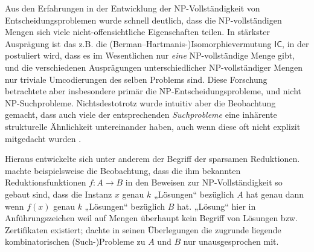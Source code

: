 

Aus den Erfahrungen in der Entwicklung der NP-Vollständigkeit von Entscheidungsproblemen wurde schnell deutlich, dass die NP-vollständigen Mengen sich viele nicht-offensichtliche Eigenschaften teilen. 
In stärkster Ausprägung ist das z.B. die (Berman–Hartmanis-\nolinebreak)\linebreak[1]Isomorphievermutung $\mathsf{IC}$, in der postuliert wird, dass es im Wesentlichen nur \emph{eine} NP-vollständige Menge gibt, und die verschiedenen Ausprägungen unterschiedlicher NP-vollständiger Mengen nur triviale Umcodierungen des selben Problems sind.
Diese Forschung betrachtete aber insbesondere primär die NP-Entscheidungsprobleme, und nicht NP-Suchprobleme.
Nichtsdestotrotz wurde intuitiv aber die Beobachtung gemacht, dass auch viele der entsprechenden \emph{Suchprobleme} eine inhärente strukturelle Ähnlichkeit untereinander haben, auch wenn diese oft nicht explizit mitgedacht wurden \parencite[vgl. auch die Diskussion von][]{hemaspaandra_take-home_1998}.

Hieraus entwickelte sich unter anderem der Begriff der sparsamen Reduktionen.
\textcite[83]{simon_central_1975} machte beispielsweise die Beobachtung, dass die ihm bekannten Reduktionsfunktionen $f\colon A\to B$ in den Beweisen zur NP-Vollständigkeit so gebaut sind, dass die Instanz $x$ genau $k$ „Lösungen“ bezüglich $A$ hat genau dann wenn $f(x)$ genau $k$ „Lösungen“ bezüglich $B$ hat. „Lösung“ hier in Anführungszeichen weil auf Mengen überhaupt kein Begriff von Lösungen bzw. Zertifikaten existiert; \citeauthor{simon_central_1975} dachte in seinen Überlegungen die zugrunde liegende kombinatorischen (Such-)Probleme zu $A$ und $B$ nur unausgesprochen mit.

